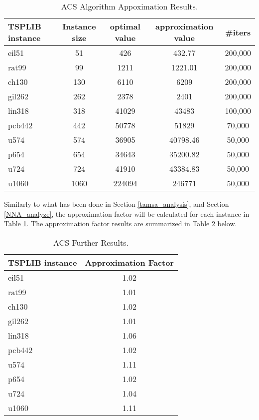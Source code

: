 \documentclass{article}
\begin{document}
\begin{table}[H]
    \caption{ACS Algorithm Appoximation Results.}
    \label{tab:ACS_results}
    \begin{tabular}{l|c|c|c|c} %
      \textbf{TSPLIB instance} & \textbf{Instance size} & \textbf{optimal value} & \textbf{approximation value} &\textbf{\#iters}\\
      \hline
    eil51 & 51 & 426 & 432.77 & 200,000\\
    rat99 & 99 & 1211 & 1221.01& 200,000 \\
    ch130 & 130 & 6110 & 6209 & 200,000\\
    gil262 & 262 & 2378 & 2401 & 200,000\\
    lin318 & 318 & 41029 & 43483 & 100,000\\
    pcb442 & 442 & 50778 & 51829 & 70,000\\
    u574 & 574  & 36905 & 40798.46 & 50,000\\ 
    p654 & 654 & 34643 & 35200.82 &50,000\\
    u724 & 724 & 41910 & 43384.83 & 50,000\\
    u1060 & 1060 & 224094 & 246771& 50,000\\
    \end{tabular}
\end{table}
Similarly to what has been done in Section \ref{tamsa_analysis}, and Section \ref{NNA_analyze}, the approximation factor will be calculated for each instance in Table \ref{tab:ACS_results}. The approximation factor results are summarized in Table \ref{tab:ACS_further} below.
\begin{table}[H]
    \caption{ACS Further Results.}
    \label{tab:ACS_further}
    \begin{tabular}{l|c} %
      \textbf{TSPLIB instance} & \textbf{Approximation Factor}\\
      \hline
    eil51 & 1.02\\
    rat99 & 1.01\\
    ch130 & 1.02\\
    gil262 & 1.01\\
    lin318 & 1.06\\
    pcb442 & 1.02\\
    u574 & 1.11\\ 
    p654 & 1.02\\
    u724 & 1.04\\
    u1060 & 1.11\\
    \end{tabular}
\end{table}
\end{document}
